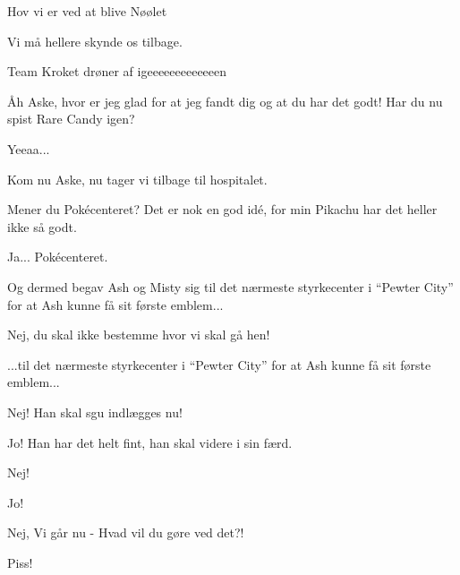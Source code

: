 \documentclass[a4paper,11pt]{article}
\begin{document}
\begin{sketch}
 Hov vi er ved at blive Nøølet

 Vi må hellere skynde os tilbage.


 Team Kroket drøner af igeeeeeeeeeeeeen


 Åh Aske, hvor er jeg glad for at jeg fandt dig og at du har det godt! Har du nu spist Rare Candy igen?


 Yeeaa...

 Kom nu Aske, nu tager vi tilbage til hospitalet.

 Mener du Pokécenteret? Det er nok en god idé, for min Pikachu har det heller ikke så godt.

 Ja... Pokécenteret.

 Og dermed begav Ash og Misty sig til det nærmeste styrkecenter i ``Pewter City'' for at Ash kunne få sit første emblem...


 Nej, du skal ikke bestemme hvor vi skal gå hen!

 ...til det nærmeste styrkecenter i ``Pewter City'' for at Ash kunne få sit første emblem...

 Nej! Han skal sgu indlægges nu!

 Jo! Han har det helt fint, han skal videre i sin færd.

 Nej!

 Jo!

 Nej, Vi går nu - Hvad vil du gøre ved det?!


 Piss!

\end{sketch}
\end{document}
